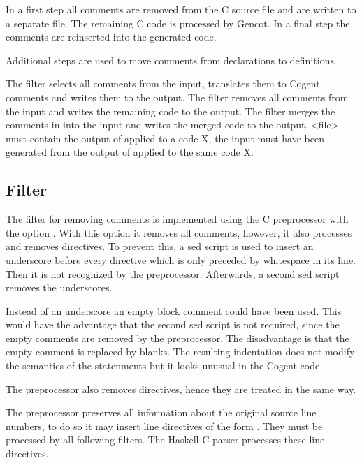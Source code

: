 
In a first step all comments are removed from the C source file and are written to a separate file. The remaining 
C code is processed by Gencot. In a final step the comments are reinserted into the generated code.

Additional steps are used to move comments from declarations to definitions.

The filter  selects all comments from the input, translates them to Cogent comments and writes 
them to the output.
The filter  removes all comments from the input and writes the remaining code to the output.
The filter  merges the comments in  into the input and writes the
merged code to the output. <file> must contain the output of  applied to a code X, the 
input must have been generated from the output of  applied to the same code X.

\subsection{Filter }

The filter for removing comments is implemented using the C preprocessor with the option . With this
option it removes all comments, however, it also processes and removes  directives. To prevent this, a sed
script is used to insert an underscore \code{\_} before every  directive which is only preceded 
by whitespace in its line. Then it is not recognized by the preprocessor. Afterwards, a second sed script removes the underscores.

Instead of an underscore an empty block comment could have been used. This would have the advantage that the second sed script
is not required, since the empty comments are removed by the preprocessor. The disadvantage is that the empty comment
is replaced by blanks. The resulting indentation does not modify the semantics of the  statenments but it
looks unusual in the Cogent code.

The preprocessor also removes  directives, hence they are treated in the same way.

The preprocessor preserves all information about the original source line numbers, to do so it may insert 
line directives of the form . They must be processed by all following filters. The Haskell
C parser  processes these line directives.

